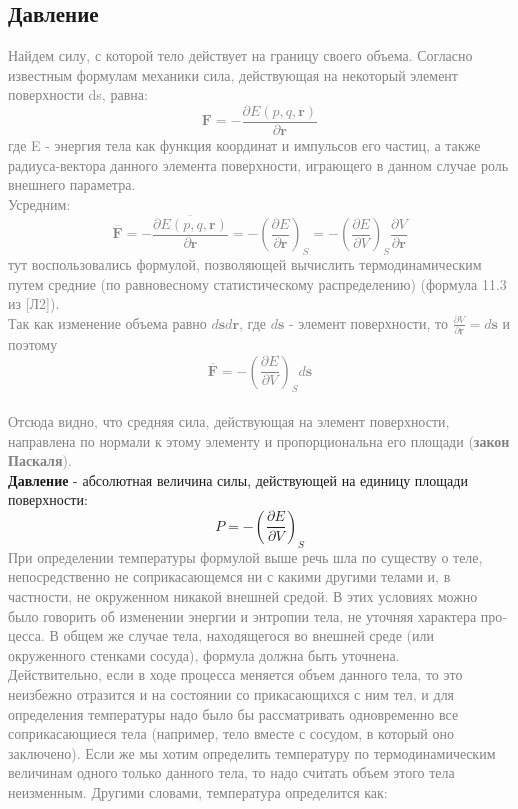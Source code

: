 \subsection{Давление}
\textcolor{gray}{
Найдем силу, с которой тело действует на границу своего объема. Согласно известным формулам механики сила, действующая на некоторый элемент поверхности ds, равна:
$$
\mathbf{F} = - \frac{\partial E(p,q, \mathbf{r})}{\partial \mathbf{r}}
$$
где E - энергия тела как функция координат и импуль­сов его частиц, а также радиуса-вектора данного элемента по­верхности, играющего в данном случае роль внешнего пара­метра.\\
Усредним:
$$
\overline{\mathbf{F}} = - \frac{\overline{\partial E(p,q, \mathbf{r})}}{\partial \mathbf{r}} = - (\frac{\partial E}{\partial \mathbf r})_S =- (\frac{\partial E}{\partial V})_S \frac{\partial V}{\partial \mathbf r}
$$
тут воспользовались формулой, позволяющей вычислить термодинамическим путем средние (по равновесному статистическому распределению) (формула 11.3 из [Л2]).\\
Так как изменение объема равно $d\mathbf s d\mathbf r$, где $d\mathbf s$ - элемент поверхности, то $\frac{\partial V}{\partial \mathbf r} = d\mathbf s$ и поэтому
$$
\overline{\mathbf{F}} = - (\frac{\partial E}{\partial V})_S d\mathbf s
$$\\
Отсюда видно, что средняя сила, действующая на элемент по­верхности, направлена по нормали к этому элементу и пропор­циональна его площади (\textbf{закон Паскаля}).\\
}
\textbf{Давление} - абсолютная величина силы, действующей на единицу площади поверхности:
\begin{equation}\label{e0}
P = - (\frac{\partial E}{\partial V})_S
\end{equation}
\textcolor{gray}{
При определении температуры формулой выше речь шла по существу о теле, непосредственно не соприкасающемся ни с ка­кими другими телами и, в частности, не окруженном никакой внешней средой. В этих условиях можно было говорить об из­менении энергии и энтропии тела, не уточняя характера про­цесса. В общем же случае тела, находящегося во внешней среде (или окруженного стенками сосуда), формула должна быть
уточнена.\\
Действительно, если в ходе процесса меняется объем
данного тела, то это неизбежно отразится и на состоянии со­
прикасающихся с ним тел, и для определения температуры надо
было бы рассматривать одновременно все соприкасающиеся те­ла (например, тело вместе с сосудом, в который оно заключено).
Если же мы хотим определить температуру по термодинамиче­ским величинам одного только данного тела, то надо считать
объем этого тела неизменным. Другими словами, температура
определится как:\\
}
